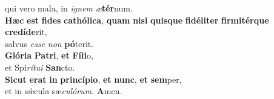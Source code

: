 \oddverse qui vero mala, in \textit{i}\textit{gnem} \textit{æ}\textbf{tér}num.\\
\evenverse \textbf{Hæc} \textbf{est} \textbf{fi}\textbf{des} \textbf{ca}\textbf{thó}\textbf{li}\textbf{ca}, \textbf{quam} \textbf{ni}\textbf{si} \textbf{quis}\textbf{que} \textbf{fi}\textbf{dé}\textbf{li}\textbf{ter} \textbf{fir}\textbf{mi}\textbf{tér}\textbf{que} \textbf{cre}\textbf{dí}\textbf{de}rit,~\*\\
\evenverse salvus \textit{es}\textit{se} \textit{non} \textbf{pó}terit.\\
\oddverse \textbf{Gló}\textbf{ri}\textbf{a} \textbf{Pa}\textbf{tri}, \textbf{et} \textbf{Fí}\textbf{li}o,~\*\\
\oddverse et Spi\textit{rí}\textit{tu}\textit{i} \textbf{San}cto.\\
\evenverse \textbf{Si}\textbf{cut} \textbf{e}\textbf{rat} \textbf{in} \textbf{prin}\textbf{cí}\textbf{pi}\textbf{o}, \textbf{et} \textbf{nunc}, \textbf{et} \textbf{sem}per,~\*\\
\evenverse et in sǽcula sæ\textit{cu}\textit{ló}\textit{rum}. \textbf{A}men.\\
